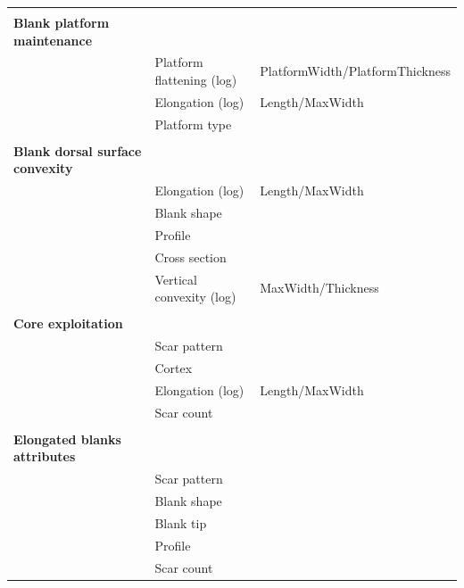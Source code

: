 \documentclass[12pt,twoside]{reedthesis}
\begin{document}
\begin{table}[!h]
{\begin{tabular}[t]{>{\bfseries}lll}
\addlinespace[0.3em]
\multicolumn{3}{l}{\textbf{ }}\\
\rowcolor[HTML]{F2F2F2}  \hspace{1em}Blank platform maintenance &  & \\
\rowcolor[HTML]{F2F2F2}  \hspace{1em} & Platform flattening (log) & PlatformWidth/PlatformThickness\\
\rowcolor[HTML]{F2F2F2}  \hspace{1em} & Elongation (log) & \vphantom{2} Length/MaxWidth\\
\rowcolor[HTML]{F2F2F2}  \hspace{1em} & Platform type & \\
\addlinespace[0.3em]
\multicolumn{3}{l}{\textbf{ }}\\
\hspace{1em}Blank dorsal surface convexity &  & \\
\hspace{1em} & Elongation (log) & \vphantom{1} Length/MaxWidth\\
\hspace{1em} & Blank shape \vphantom{1} & \\
\hspace{1em} & Profile \vphantom{1} & \\
\hspace{1em} & Cross section & \\
\hspace{1em} & Vertical convexity (log) & MaxWidth/Thickness\\
\addlinespace[0.3em]
\multicolumn{3}{l}{\textbf{ }}\\
\rowcolor[HTML]{F2F2F2}  \hspace{1em}Core exploitation &  & \\
\rowcolor[HTML]{F2F2F2}  \hspace{1em} & Scar pattern \vphantom{1} & \\
\rowcolor[HTML]{F2F2F2}  \hspace{1em} & Cortex & \\
\rowcolor[HTML]{F2F2F2}  \hspace{1em} & Elongation (log) & Length/MaxWidth\\
\rowcolor[HTML]{F2F2F2}  \hspace{1em} & Scar count \vphantom{1} & \\
\addlinespace[0.3em]
\multicolumn{3}{l}{\textbf{ }}\\
\hspace{1em}Elongated blanks attributes &  & \\
\hspace{1em} & Scar pattern & \\
\hspace{1em} & Blank shape & \\
\hspace{1em} & Blank tip & \\
\hspace{1em} & Profile & \\
\hspace{1em} & Scar count & \\
\bottomrule
\end{tabular}}
\end{table}
\end{document}

